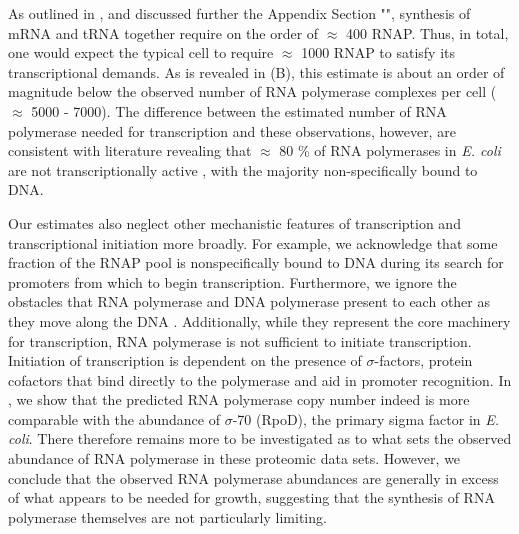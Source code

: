 As outlined in , and discussed further the Appendix
Section "", synthesis of mRNA and tRNA together require
on the order of $\approx$ 400 RNAP. Thus, in total, one would expect the
typical cell to require $\approx$ 1000 RNAP to satisfy its transcriptional
demands. As is revealed in (B), this estimate is about an
order of magnitude below the observed number of RNA polymerase complexes per
cell ($\approx$ 5000 - 7000). The difference between the estimated number of
RNA polymerase needed for transcription and these observations, however, are
consistent with literature revealing that $\approx$ 80 \% of RNA
polymerases in \textit{E. coli} are not transcriptionally active
\citep{klumpp2008, patrick2015}, with the majority non-specifically bound to 
DNA.

Our estimates also neglect other mechanistic features of transcription and
transcriptional initiation more broadly. For example, we acknowledge that
some fraction of the RNAP pool is nonspecifically bound to DNA during its
search for promoters from which to begin transcription. Furthermore, we
ignore the obstacles that RNA polymerase and DNA polymerase present to each
other as they move along the DNA \citep{finkelstein2013}. Additionally, while
they represent the core machinery for transcription, RNA polymerase is not
sufficient to initiate transcription. Initiation of transcription is
dependent on the presence of $\sigma$-factors, protein cofactors that bind
directly to the polymerase \citep{browning2016} and aid in promoter
recognition. In , we show that the predicted
RNA polymerase copy number indeed is more comparable with the abundance of
$\sigma$-70 (RpoD), the primary sigma factor in \textit{E. coli}. There
therefore remains more to be investigated as to what sets the observed
abundance of RNA polymerase in these proteomic data sets. However, we
conclude that the observed RNA polymerase abundances are generally in excess
of what appears to be needed for growth, suggesting that the synthesis of RNA
polymerase themselves are not particularly limiting.

